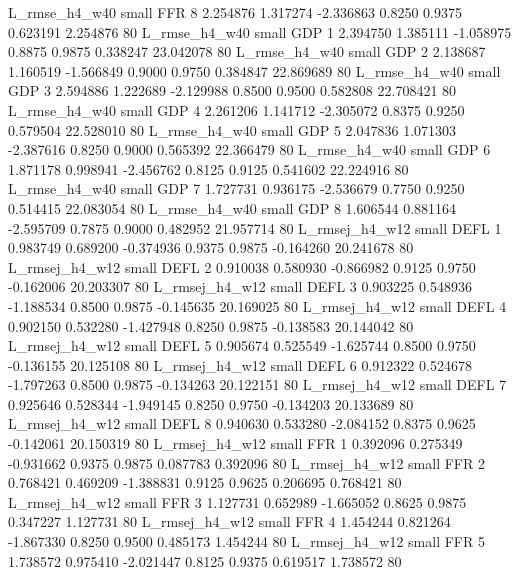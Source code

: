  L_rmse_h4_w40      small      FFR                 8 2.254876 1.317274 -2.336863 0.8250 0.9375  0.623191    2.254876 80
 L_rmse_h4_w40      small      GDP                 1 2.394750 1.385111 -1.058975 0.8875 0.9875  0.338247   23.042078 80
 L_rmse_h4_w40      small      GDP                 2 2.138687 1.160519 -1.566849 0.9000 0.9750  0.384847   22.869689 80
 L_rmse_h4_w40      small      GDP                 3 2.594886 1.222689 -2.129988 0.8500 0.9500  0.582808   22.708421 80
 L_rmse_h4_w40      small      GDP                 4 2.261206 1.141712 -2.305072 0.8375 0.9250  0.579504   22.528010 80
 L_rmse_h4_w40      small      GDP                 5 2.047836 1.071303 -2.387616 0.8250 0.9000  0.565392   22.366479 80
 L_rmse_h4_w40      small      GDP                 6 1.871178 0.998941 -2.456762 0.8125 0.9125  0.541602   22.224916 80
 L_rmse_h4_w40      small      GDP                 7 1.727731 0.936175 -2.536679 0.7750 0.9250  0.514415   22.083054 80
 L_rmse_h4_w40      small      GDP                 8 1.606544 0.881164 -2.595709 0.7875 0.9000  0.482952   21.957714 80
L_rmsej_h4_w12      small     DEFL                 1 0.983749 0.689200 -0.374936 0.9375 0.9875 -0.164260   20.241678 80
L_rmsej_h4_w12      small     DEFL                 2 0.910038 0.580930 -0.866982 0.9125 0.9750 -0.162006   20.203307 80
L_rmsej_h4_w12      small     DEFL                 3 0.903225 0.548936 -1.188534 0.8500 0.9875 -0.145635   20.169025 80
L_rmsej_h4_w12      small     DEFL                 4 0.902150 0.532280 -1.427948 0.8250 0.9875 -0.138583   20.144042 80
L_rmsej_h4_w12      small     DEFL                 5 0.905674 0.525549 -1.625744 0.8500 0.9750 -0.136155   20.125108 80
L_rmsej_h4_w12      small     DEFL                 6 0.912322 0.524678 -1.797263 0.8500 0.9875 -0.134263   20.122151 80
L_rmsej_h4_w12      small     DEFL                 7 0.925646 0.528344 -1.949145 0.8250 0.9750 -0.134203   20.133689 80
L_rmsej_h4_w12      small     DEFL                 8 0.940630 0.533280 -2.084152 0.8375 0.9625 -0.142061   20.150319 80
L_rmsej_h4_w12      small      FFR                 1 0.392096 0.275349 -0.931662 0.9375 0.9875  0.087783    0.392096 80
L_rmsej_h4_w12      small      FFR                 2 0.768421 0.469209 -1.388831 0.9125 0.9625  0.206695    0.768421 80
L_rmsej_h4_w12      small      FFR                 3 1.127731 0.652989 -1.665052 0.8625 0.9875  0.347227    1.127731 80
L_rmsej_h4_w12      small      FFR                 4 1.454244 0.821264 -1.867330 0.8250 0.9500  0.485173    1.454244 80
L_rmsej_h4_w12      small      FFR                 5 1.738572 0.975410 -2.021447 0.8125 0.9375  0.619517    1.738572 80
